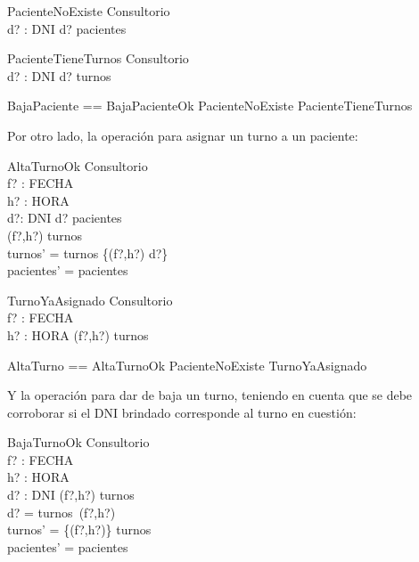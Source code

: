\documentclass[12pt]{article}
\begin{document}
\begin{schema}{PacienteNoExiste}
\Xi Consultorio \\
d? : DNI
\where
d? \notin \dom pacientes
\end{schema}

\begin{schema}{PacienteTieneTurnos}
\Xi Consultorio \\
d? : DNI
\where
d? \in \ran turnos
\end{schema}

\begin{zed}
BajaPaciente == BajaPacienteOk \lor PacienteNoExiste \lor PacienteTieneTurnos
\end{zed}

Por otro lado, la operación para asignar un turno a un paciente:

\begin{schema}{AltaTurnoOk}
\Delta Consultorio \\
f? : FECHA \\
h? : HORA \\
d?: DNI
\where
d? \in \dom pacientes \\
(f?,h?) \notin \dom turnos \\
turnos' = turnos  \cup \{(f?,h?) \mapsto d?\} \\
pacientes' = pacientes
\end{schema}

\begin{schema}{TurnoYaAsignado}
\Xi Consultorio \\
f? : FECHA \\
h? : HORA
\where
(f?,h?) \in \dom turnos
\end{schema}

\begin{zed}
AltaTurno == AltaTurnoOk \lor PacienteNoExiste \lor TurnoYaAsignado
\end{zed}

Y la operación para dar de baja un turno, teniendo en cuenta que se debe corroborar si el DNI brindado corresponde al turno en cuestión:

\begin{schema}{BajaTurnoOk}
\Delta Consultorio \\
f? : FECHA \\
h? : HORA \\
d? : DNI
\where
(f?,h?) \in \dom turnos \\
d? = turnos\ (f?,h?) \\
turnos' = \{(f?,h?)\} \ndres turnos \\
pacientes' = pacientes
\end{schema}
\end{document}
